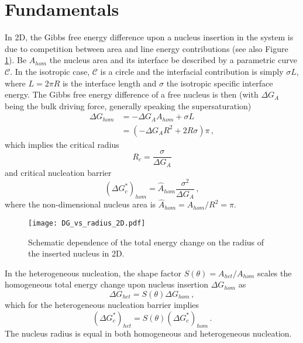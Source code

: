 %


\section{Fundamentals}
In 2D, the Gibbs free energy difference upon a nucleus insertion in the system is due to competition between area and line energy contributions (see also Figure \ref{fig_DG_2D_sketch}). Be $A_{hom}$ the nucleus area and its interface be described by a parametric curve $\mathcal{C}$. In the isotropic case, $\mathcal{C}$ is a circle and the interfacial contribution is simply $\sigma L$, where $L=2\pi R$ is the interface length and $\sigma$ the isotropic specific interface energy. The Gibbs free energy difference of a free nucleus is then (with $\Delta G_A$ being the bulk driving force, generally speaking the supersaturation)
\begin{align}
	\Delta G_{hom} &= -\Delta G_A A_{hom} + \sigma L \\
	\label{eq_DG_hom_iso}	&= (-\Delta G_A R^2 + 2R\sigma)\pi \,,
\end{align}
which implies the critical radius
\begin{equation} \label{eq_crit_radius_2D}
	R_c = \frac{\sigma}{\Delta G_A}
\end{equation}
and critical nucleation barrier
\begin{equation} \label{eq_nucl_barr_hom_2D}
	(\Delta G_c^*)_{hom} = \hat{A}_{hom}\frac{\sigma^2}{\Delta G_A}\,,
\end{equation}
where the non-dimensional nucleus area is $\hat{A}_{hom}=A_{hom}/R^2=\pi$.

\begin{figure}
	\centering
	\texttt{[image: DG\_vs\_radius\_2D.pdf]}
	\caption{Schematic dependence of the total energy change on the radius of the inserted nucleus in 2D.}
	\label{fig_DG_2D_sketch}
\end{figure}

In the heterogeneous nucleation, the shape factor $S(\theta)=A_{het}/A_{hom}$ scales the homogeneous total energy change upon nucleus insertion $\Delta G_{hom}$ as
\begin{equation}\label{eq_DG_het_2D}
	\Delta G_{het} = S(\theta)\Delta G_{hom} \,,
\end{equation}
which for the heterogeneous nucleation barrier implies
\begin{equation}\label{eq_nucl_barr_het_2D}
	(\Delta G_c^*)_{het} = S(\theta)(\Delta G_c^*)_{hom}\,.
\end{equation}
The nucleus radius is equal in both homogeneous and heterogeneous nucleation.

